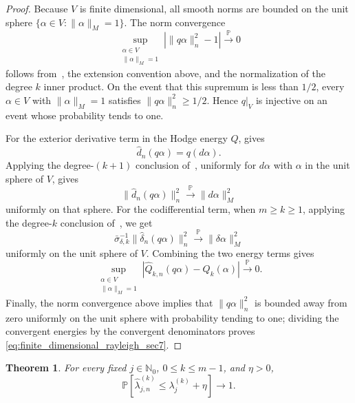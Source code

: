 \documentclass[11pt,reqno]{amsproc}
\numberwithin{equation}{section}
\newcommand{\N}{\mathbb{N}}
\newcommand{\PP}{\mathbb{P}}
\newcommand{\hd}{\hat{d}}
\newcommand{\hdelta}{\hat{\delta}}
\newtheorem{theorem}[counter]{Theorem}
\theoremstyle{definition}
\theoremstyle{plain}
\begin{document}
    \begin{proof}
    Because $V$ is finite dimensional, all smooth norms are bounded on the unit sphere $\{\alpha\in V:\|\alpha\|_M=1\}$.  The norm convergence
    \[
        \sup_{\substack{\alpha\in V\\ \|\alpha\|_M=1}}
        \left|\|q\alpha\|_n^2-1\right|
        \xrightarrow{\PP}0
    \]
        follows from~, the extension convention above, and the normalization of the degree $k$ inner product.  On the event that this supremum is less than $1/2$, every $\alpha\in V$ with $\|\alpha\|_M=1$ satisfies $\|q\alpha\|_n^2\geq 1/2$.  Hence $q|_V$ is injective on an event whose probability tends to one.

    For the exterior derivative term in the Hodge energy $Q$,  gives
    \[
        \hd_n(q\alpha)=q(d\alpha).
    \]
    Applying the degree-$(k+1)$ conclusion of~, uniformly for $d\alpha$ with $\alpha$ in the unit sphere of $V$, gives
    \[
        \|\hd_n(q\alpha)\|_n^2
        \xrightarrow{\PP}
        \|d\alpha\|_M^2
    \]
    uniformly on that sphere.  For the codifferential term, when $m \geq k \geq 1$, applying the degree-$k$ conclusion of~, we get
    \[
        \bar{\sigma}_{\delta,k}^{-1}\|\hdelta_n(q\alpha)\|_n^2
        \xrightarrow{\PP}
        \|\delta\alpha\|_M^2
    \]
    uniformly on the unit sphere of $V$. Combining the two energy terms gives
    \[
        \sup_{\substack{\alpha\in V\\ \|\alpha\|_M=1}}
        \left|\widehat Q_{k,n}(q\alpha)-Q_k(\alpha)\right|
        \xrightarrow{\PP}0.
    \]
    Finally, the norm convergence above implies that $\|q\alpha\|_n^2$ is bounded away from zero uniformly on the unit sphere with probability tending to one; dividing the convergent energies by the convergent denominators proves \eqref{eq:finite_dimensional_rayleigh_sec7}.
    \end{proof}

    \begin{theorem} \label{thm:rips_spectral_upper_bound_sec7}
    For every fixed $j\in\N_0$, $0\leq k\leq m-1$, and $\eta>0$,
    \begin{equation} \label{eq:rips_spectral_upper_bound_sec7}
        \PP\left[\widehat\lambda^{(k)}_{j,n}\leq \lambda^{(k)}_j+\eta\right]\to 1.
    \end{equation}
    \end{theorem}
\end{document}
